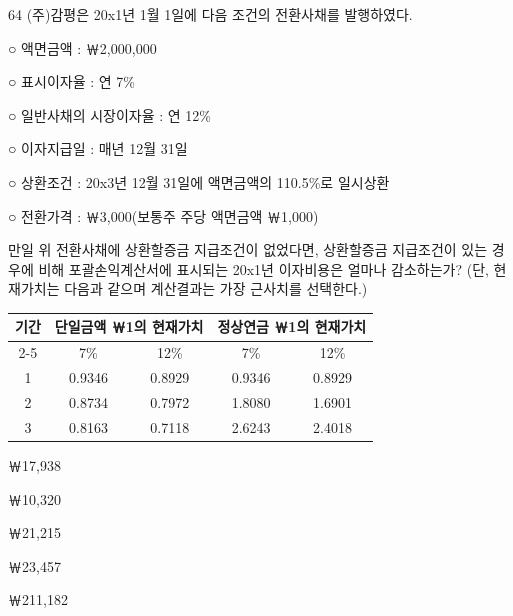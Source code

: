 \begin{question}{64}
(주)감평은 20x1년 1월 1일에 다음 조건의 전환사채를 발행하였다.
\begin{framedtext}
○ 액면금액 : ￦2,000,000 \par
○ 표시이자율 : 연 7\% \par
○ 일반사채의 시장이자율 : 연 12\% \par
○ 이자지급일 : 매년 12월 31일 \par
○ 상환조건 : 20x3년 12월 31일에 액면금액의 110.5\%로 일시상환 \par
○ 전환가격 : ￦3,000(보통주 주당 액면금액 ￦1,000)
\end{framedtext}
만일 위 전환사채에 상환할증금 지급조건이 없었다면, 상환할증금 지급조건이 있는 경우에 비해 포괄손익계산서에 표시되는 20x1년 이자비용은 얼마나 감소하는가? (단, 현재가치는 다음과 같으며 계산결과는 가장 근사치를 선택한다.) \par
{\small\centering\begin{tabular}{|c|c|c|c|c|}
\hline
\multirow{2}{*}{기간} & \multicolumn{2}{c|}{단일금액 ￦1의 현재가치} & \multicolumn{2}{c|}{정상연금 ￦1의 현재가치} \\ \cline{2-5}
 & 7\% & 12\% & 7\% & 12\% \\ \hline
1 & 0.9346 & 0.8929 & 0.9346 & 0.8929 \\ \hline
2 & 0.8734 & 0.7972 & 1.8080 & 1.6901 \\ \hline
3 & 0.8163 & 0.7118 & 2.6243 & 2.4018 \\ \hline
\end{tabular}\par}
\begin{choices}
  \item ￦17,938
  \item ￦10,320
  \item ￦21,215
  \item ￦23,457
  \item ￦211,182
\end{choices}
\end{question}
